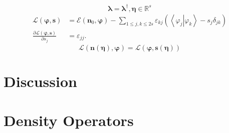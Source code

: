 \documentclass[aps,preprint]{revtex4}%
\begin{document}
\begin{equation}
\boldsymbol{\lambda}=\boldsymbol{\lambda}^{\dagger},\boldsymbol{\eta\in
}\mathbb{R}^{s}%
\end{equation}%
\begin{align}
\mathcal{L}\left(  \boldsymbol{\varphi,s}\right)   &  =\mathcal{E}\left(
\boldsymbol{n}_{0}\boldsymbol{,\varphi}\right)  -\sum_{1\leq j,k\leq
2s}\varepsilon_{kj}\left(  \left\langle \left.  \varphi_{j}\right\vert
\varphi_{k}\right\rangle -s_{j}\delta_{jk}\right) \\
\frac{\partial\mathcal{L}\left(  \boldsymbol{\varphi,s}\right)  }{\partial
s_{j}}  &  =\varepsilon_{jj}.
\end{align}%
\begin{equation}
\mathcal{L}\left(  \boldsymbol{n\left(  \boldsymbol{\eta}\right)  ,\varphi
}\right)  =\mathcal{L}\left(  \boldsymbol{\varphi,s}\left(  \boldsymbol{\eta
}\right)  \right)
\end{equation}


\section{Discussion}

\appendix


\section{Density Operators \label{Denmat}}
\end{document}
